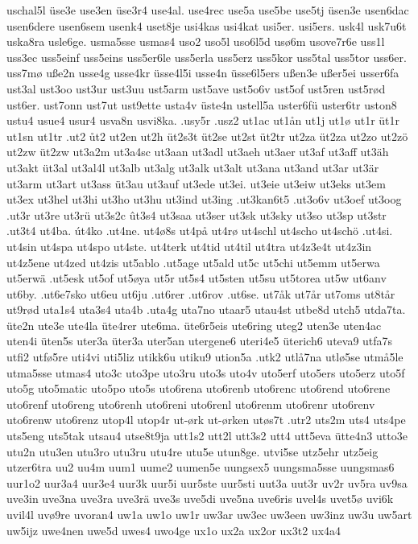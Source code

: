{{uschal5l
üse3e
use3en
üse3r4
use4al.
use4rec
use5a
use5be
use5tj
üsen3e
usen6dac
usen6dere
usen6sem
usenk4
uset8je
usi4kas
usi4kat
usi5er.
usi5ers.
usk4l
usk7u6t
uska8ra
usle6ge.
usma5sse
usmas4
uso2
uso5l
uso6l5d
usø6m
usove7r6e
uss1l
uss3ec
uss5einf
uss5eins
uss5er6le
uss5erla
uss5erz
uss5kor
uss5tal
uss5tor
uss6er.
uss7mø
uße2n
usse4g
usse4kr
üsse4l5i
usse4n
üsse6l5ers
ußen3e
ußer5ei
usser6fa
ust3al
ust3oo
ust3ur
ust3uu
ust5arm
ust5ave
ust5o6v
ust5of
ust5ren
ust5rød
ust6er.
ust7onn
ust7ut
ust9ette
usta4v
üste4n
ustell5a
uster6fü
uster6tr
uston8
ustu4
usue4
usur4
usva8n
usvi8ka.
.usy5r
.usz2
ut1ac
ut1ån
ut1j
ut1ø
ut1r
üt1r
ut1sn
ut1tr
.ut2
ůt2
ut2en
ut2h
üt2s3t
üt2se
ut2st
üt2tr
ut2za
üt2za
ut2zo
ut2zö
ut2zw
üt2zw
ut3a2m
ut3a4sc
ut3aan
ut3adl
ut3aeh
ut3aer
ut3af
ut3aff
ut3äh
ut3akt
üt3al
ut3al4l
ut3alb
ut3alg
ut3alk
ut3alt
ut3ana
ut3and
ut3ar
ut3är
ut3arm
ut3art
ut3ass
üt3au
ut3auf
ut3ede
ut3ei.
ut3eie
ut3eiw
ut3eks
ut3em
ut3ex
ut3hel
ut3hi
ut3ho
ut3hu
ut3ind
ut3ing
.ut3kan6t5
.ut3o6v
ut3oef
ut3oog
.ut3r
ut3re
ut3rü
ut3s2c
ût3s4
ut3saa
ut3ser
ut3sk
ut3sky
ut3so
ut3sp
ut3str
.ut3t4
ut4ba.
út4ko
.ut4ne.
ut4ø8s
ut4på
ut4rø
ut4schl
ut4scho
ut4schö
.ut4si.
ut4sin
ut4spa
ut4spo
ut4ste.
ut4terk
ut4tid
ut4til
ut4tra
ut4z3e4t
ut4z3in
ut4z5ene
ut4zed
ut4zis
ut5ablo
.ut5age
ut5ald
ut5c
ut5chi
ut5emm
ut5erwa
ut5erwä
.ut5esk
ut5of
ut5øya
ut5r
ut5s4
ut5sten
ut5su
ut5torea
ut5w
ut6anv
ut6by.
.ut6e7sko
ut6eu
ut6ju
.ut6rer
.ut6rov
.ut6se.
ut7åk
ut7år
ut7oms
ut8tår
ut9rød
uta1s4
uta3s4
uta4b
.uta4g
uta7no
utaar5
utau4st
utbe8d
utch5
utda7ta.
üte2n
ute3e
ute4la
üte4rer
ute6ma.
üte6r5eis
ute6ring
uteg2
uten3e
uten4ac
uten4i
üten5s
uter3a
üter3a
uter5an
utergene6
uteri4e5
üterich6
uteva9
utfa7s
utfi2
utfø5re
uti4vi
uti5liz
utikk6u
utiku9
ution5a
.utk2
utlå7na
utlø5se
utmå5le
utma5sse
utmas4
uto3c
uto3pe
uto3ru
uto3s
uto4v
uto5erf
uto5ers
uto5erz
uto5f
uto5g
uto5matic
uto5po
uto5s
uto6rena
uto6renb
uto6renc
uto6rend
uto6rene
uto6renf
uto6reng
uto6renh
uto6reni
uto6renl
uto6renm
uto6renr
uto6renv
uto6renw
uto6renz
utop4l
utop4r
ut-ørk
ut-ørken
utøs7t
.utr2
uts2m
uts4
uts4pe
uts5eng
uts5tak
utsau4
utse8t9ja
utt1s2
utt2l
utt3s2
utt4
utt5eva
ütte4n3
utto3e
utu2n
utu3en
utu3ro
utu3ru
utu4re
utu5e
utun8ge.
utvi5se
utz5ehr
utz5eig
utzer6tra
uu2
uu4m
uum1
uume2
uumen5e
uungsex5
uungsma5sse
uungsmas6
uur1o2
uur3a4
uur3e4
uur3k
uur5i
uur5ste
uur5sti
uut3a
uut3r
uv2r
uv5ra
uv9sa
uve3in
uve3na
uve3ra
uve3rä
uve3s
uve5di
uve5na
uve6ris
uvel4s
uvet5ø
uvi6k
uvil4l
uvø9re
uvoran4
uw1a
uw1o
uw1r
uw3ar
uw3ec
uw3een
uw3inz
uw3u
uw5art
uw5ijz
uwe4nen
uwe5d
uwes4
uwo4ge
ux1o
ux2a
ux2or
ux3t2
ux4a4
}}
